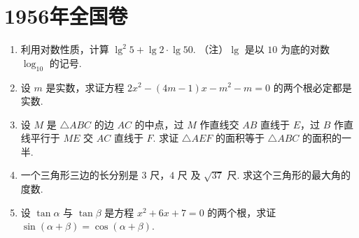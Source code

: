 \documentclass[UTF8,a4paper,oneside,11pt]{ctexbook}
\begin{document}
\mainmatter

\chapter{1956年全国卷}

\begin{problem}
\begin{enumerate}
\item 利用对数性质，计算 \(\lg^{2}5+\lg2\cdot\lg50\). （注）\(\lg\) 是以 \(10\) 为底的对数 \(\log_{10}\) 的记号.

\item 设 \(m\) 是实数，求证方程 \(2x^{2}-\left(4m-1\right)x-m^{2}-m=0\) 的两个根必定都是实数.

\item 设 \(M\) 是 \(\triangle ABC\) 的边 \(AC\) 的中点，过 \(M\) 作直线交 \(AB\) 直线于 \(E\)，过 \(B\) 作直线平行于 \(ME\) 交 \(AC\) 直线于 \(F\). 求证 \(\triangle AEF\) 的面积等于 \(\triangle ABC\) 的面积的一半.

\item 一个三角形三边的长分别是 \(3\text{ 尺}\)，\(4\text{ 尺}\) 及 \(\sqrt{37}\text{ 尺}\). 求这个三角形的最大角的度数.

\item 设 \(\tan\alpha\) 与 \(\tan\beta\) 是方程 \(x^{2}+6x+7=0\) 的两个根，求证 \(\sin\left(\alpha+\beta\right)=\cos\left(\alpha+\beta\right)\).
\end{enumerate}
\end{problem}
\end{document}
